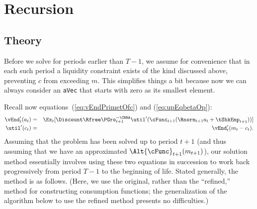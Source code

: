 \documentclass[titlepage]{\econtex}
\begin{document}
\hypertarget{Recursions}{}
\section{Recursion}\label{sec:recursion}
\hypertarget{Theory}{}
\subsection{Theory}
Before we solve for periods earlier than $T-1$, we assume for
convenience that in each such period a liquidity constraint exists of
the kind discussed above, preventing ${c}$ from exceeding ${m}$. This
simplifies things a bit because now we can always consider an
\texttt{aVec} that starts with zero as its smallest element.

Recall now equations~(\ref{eq:vEndPrimetOfc}) and (\ref{eq:upEqbetaOp}):
\begin{eqnarray*}
  \vEnd_{t}^{\prime}({a}_{t}) & = & \Ex_{t}[\Discount \Rfree \PGro_{t+1}^{-\CRRA}
                                    \util^{\prime}(\cFunc_{t+1}(\Rnorm_{t+1} {a}_{t}+{\tShkEmp}_{t+1}))]
  \\\util^{\prime}({c}_{t})  & = & \vEnd_{t}^{\prime}({m}_{t}-{c}_{t}).
\end{eqnarray*}
Assuming that the problem has been solved up to period $t+1$ (and thus
assuming that we have an approximated $\Alt{\cFunc}_{t+1}({m}_{t+1})$), our solution method essentially
involves using these two equations in succession to work back
progressively from period $T-1$ to the beginning of life.  Stated
generally, the method is as follows.  (Here, we use the original, rather than the ``refined,'' method for 
constructing consumption functions; the generalization of the algorithm below to use the refined method presents
no difficulties.)
\end{document}
